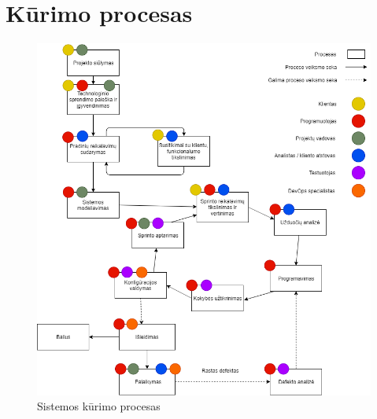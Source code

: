 \documentclass{VUMIFPSkursinis}
\begin{document}
\section{Kūrimo procesas}
	\begin{figure}[htbp]
	\includegraphics[scale=0.6]{img/SoftwareProcessMoonTechnologies}
	\caption{Sistemos kūrimo procesas} %
	\label{img:kurimoProcesas}
	\end{figure}
\end{document}
